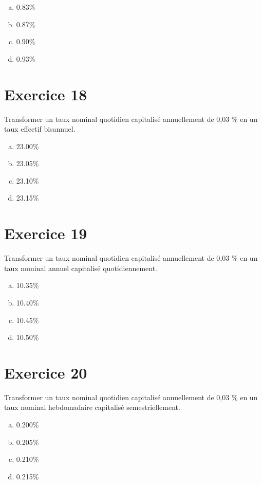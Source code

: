 \documentclass[10pt,a4paper]{article}
\begin{document}
\begin{enumerate}[a)]
\item 0.83\%
\item 0.87\%
\item 0.90\%
\item 0.93\%
\end{enumerate}


\section*{Exercice 18}
Transformer un taux nominal quotidien capitalisé annuellement de 0,03 \% en un taux effectif bisannuel.



\begin{enumerate}[a)]
\item 23.00\%
\item 23.05\%
\item 23.10\%
\item 23.15\%
\end{enumerate}


\section*{Exercice 19}
Transformer un taux nominal quotidien capitalisé annuellement de 0,03 \% en un taux nominal annuel capitalisé quotidiennement.



\begin{enumerate}[a)]
\item 10.35\%
\item 10.40\%
\item 10.45\%
\item 10.50\%
\end{enumerate}


\section*{Exercice 20}
Transformer un taux nominal quotidien capitalisé annuellement de 0,03 \% en un taux nominal hebdomadaire capitalisé semestriellement.



\begin{enumerate}[a)]
\item 0.200\%
\item 0.205\%
\item 0.210\%
\item 0.215\%
\end{enumerate}
\end{document}
